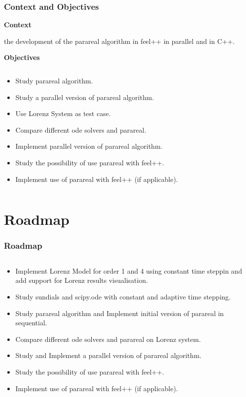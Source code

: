 \documentclass[
	11pt,
]{beamer}
\newcommand\myheading[1]{%
  \par\bigskip
  {\Large\bfseries#1}\par\smallskip}
\begin{document}
\begin{frame}
	\frametitle{Context and Objectives}
	\myheading{Context}


	the development of the parareal algorithm in feel++ in parallel and in C++.

	\myheading{Objectives}

	\begin{columns}[c]
		\begin{column}{\textwidth}
			\begin{itemize}
				\item Study parareal algorithm.
				\item Study a parallel version of parareal algorithm.
				\item Use Lorenz System\cite{lorenz1963deterministic} as test case.
				\item Compare different ode solvers and parareal.
				\item Implement parallel version of parareal algorithm.
				\item Study the possibility of use parareal with feel++.
				\item Implement use of parareal with feel++ (if applicable).
			\end{itemize}
		\end{column}

	\end{columns}

\end{frame}


\section{Roadmap}
\begin{frame}
	\frametitle{Roadmap}
	\begin{columns}[c]
		\begin{column}{\textwidth}
			\begin{itemize}
				\item Implement Lorenz Model for order 1 and 4 using constant time steppin and add support for Lorenz results visualisation.
				\item Study sundials and scipy.ode with constant and adaptive time stepping.
				\item Study parareal algorithm and Implement initial version of parareal in sequential.
				\item Compare different ode solvers and parareal on Lorenz system.
				\item Study and Implement a parallel version of parareal algorithm.
				\item Study the possibility of use parareal with feel++.
				\item Implement use of parareal with feel++ (if applicable).
			\end{itemize}
		\end{column}
	\end{columns}
\end{frame}
\end{document}
